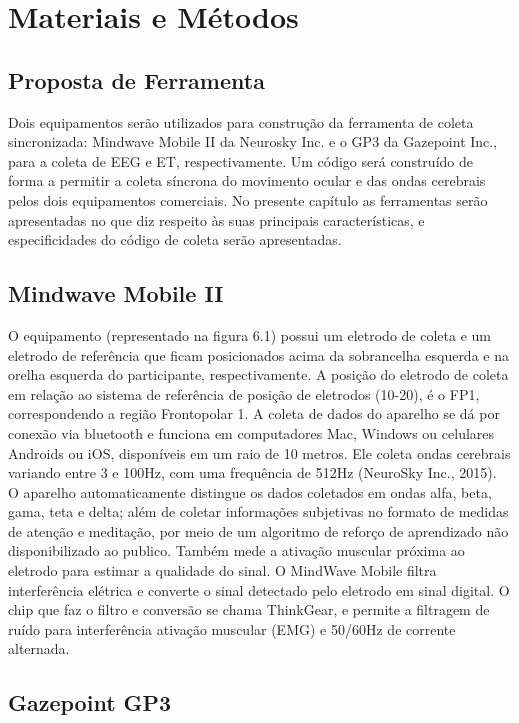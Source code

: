 \chapter{Materiais e Métodos}

\section{Proposta de Ferramenta}

Dois equipamentos serão utilizados para construção da ferramenta de coleta sincronizada: Mindwave Mobile II da Neurosky Inc. e o
GP3 da Gazepoint Inc., para a coleta de EEG e ET, respectivamente. Um código será construído de forma a permitir a coleta 
síncrona do movimento ocular e das ondas cerebrais pelos dois equipamentos comerciais. 
No presente capítulo as ferramentas serão apresentadas no que diz respeito às suas principais características, 
e especificidades do código de coleta serão apresentadas.

\section{Mindwave Mobile II}
O equipamento (representado na figura 6.1) possui um eletrodo de coleta e um eletrodo de referência que ficam posicionados 
acima da sobrancelha esquerda e na orelha esquerda do participante, respectivamente. 
A posição do eletrodo de coleta em relação ao sistema de referência de posição de eletrodos (10-20), é o FP1, 
correspondendo a região Frontopolar 1. A coleta de dados do aparelho se dá por conexão via bluetooth e 
funciona em computadores Mac, Windows ou celulares Androids ou iOS, disponíveis em um raio de 10 metros. 
Ele coleta ondas cerebrais variando entre 3 e 100Hz, com uma frequência de 512Hz (NeuroSky Inc., 2015). 
O aparelho automaticamente distingue os dados coletados em ondas alfa, beta, gama, teta e delta; 
além de coletar informações subjetivas no formato de medidas de atenção e meditação, 
por meio de um algoritmo de reforço de aprendizado não disponibilizado ao publico. 
Também mede a ativação muscular próxima ao eletrodo para estimar a qualidade do sinal. 
O MindWave Mobile filtra interferência elétrica e converte o sinal detectado pelo eletrodo em sinal digital. 
O chip que faz o filtro e conversão se chama ThinkGear, e permite a filtragem de ruído para interferência ativação muscular (EMG) e 50/60Hz de corrente alternada. 

\section{Gazepoint GP3}


